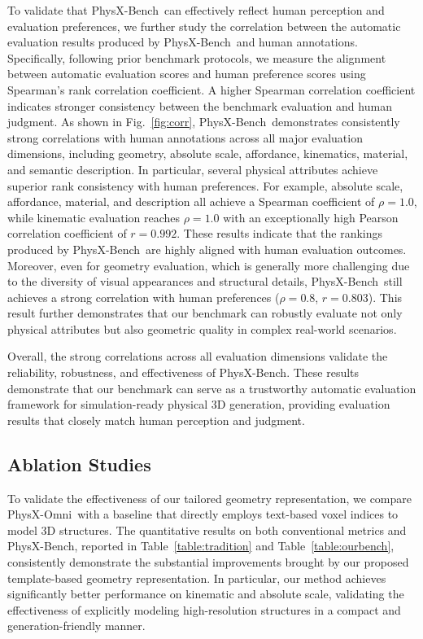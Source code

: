 \documentclass[11pt]{article}
\def\ourname{PhysX-Omni}
\def\ourbench{PhysX-Bench}
\begin{document}
To validate that \ourbench\ can effectively reflect human perception and evaluation preferences, we further study the correlation between the automatic evaluation results produced by \ourbench\ and human annotations. Specifically, following prior benchmark protocols, we measure the alignment between automatic evaluation scores and human preference scores using Spearman’s rank correlation coefficient. A higher Spearman correlation coefficient indicates stronger consistency between the benchmark evaluation and human judgment. As shown in Fig.~\ref{fig:corr}, \ourbench\ demonstrates consistently strong correlations with human annotations across all major evaluation dimensions, including geometry, absolute scale, affordance, kinematics, material, and semantic description. In particular, several physical attributes achieve superior rank consistency with human preferences. For example, absolute scale, affordance, material, and description all achieve a Spearman coefficient of $\rho=1.0$, while kinematic evaluation reaches $\rho=1.0$ with an exceptionally high Pearson correlation coefficient of $r=0.992$. These results indicate that the rankings produced by \ourbench\ are highly aligned with human evaluation outcomes. Moreover, even for geometry evaluation, which is generally more challenging due to the diversity of visual appearances and structural details, \ourbench\ still achieves a strong correlation with human preferences ($\rho=0.8$, $r=0.803$). This result further demonstrates that our benchmark can robustly evaluate not only physical attributes but also geometric quality in complex real-world scenarios.

Overall, the strong correlations across all evaluation dimensions validate the reliability, robustness, and effectiveness of \ourbench. These results demonstrate that our benchmark can serve as a trustworthy automatic evaluation framework for simulation-ready physical 3D generation, providing evaluation results that closely match human perception and judgment.



\subsection{Ablation Studies}

To validate the effectiveness of our tailored geometry representation, we compare \ourname\ with a baseline that directly employs text-based voxel indices to model 3D structures. The quantitative results on both conventional metrics and \ourbench, reported in Table~\ref{table:tradition} and Table~\ref{table:ourbench}, consistently demonstrate the substantial improvements brought by our proposed template-based geometry representation. In particular, our method achieves significantly better performance on kinematic and absolute scale, validating the effectiveness of explicitly modeling high-resolution structures in a compact and generation-friendly manner.
\end{document}

